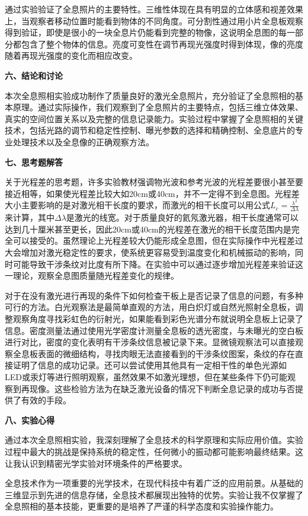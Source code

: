 ﻿\documentclass[12pt,a4paper]{article}
\begin{document}
通过实验验证了全息照片的主要特性。三维性体现在具有明显的立体感和视差效果上，当观察者移动位置时能看到物体的不同角度。可分割性通过用小片全息板观察得到验证，即使是很小的一块全息片仍能看到完整的物像，这说明全息图的每一部分都包含了整个物体的信息。亮度可变性在调节再现光强度时得到体现，像的亮度随着再现光强度的变化而相应改变。

\textbf{六、结论和讨论}

本次全息照相实验成功制作了质量良好的激光全息照片，充分验证了全息照相的基本原理。通过实际操作，我们观察到了全息照片的主要特点，包括三维立体效果、真实的空间位置关系以及完整的信息记录能力。实验过程中掌握了全息照相的关键技术，包括光路的调节和稳定性控制、曝光参数的选择和精确控制、全息底片的专业处理技术以及全息像的正确观察方法。

\textbf{七、思考题解答}

关于光程差的思考题，许多实验教材强调物光波和参考光波的光程差要很小甚至要接近相等，如果使光程差比较大如20cm或40cm，并不一定得不到全息图。光程差大小主要影响的是对激光相干长度的要求，而激光的相干长度可以用公式$L_c = \frac{\lambda^2}{\Delta\lambda}$来计算，其中$\Delta\lambda$是激光的线宽。对于质量良好的氦氖激光器，相干长度通常可以达到几十厘米甚至更长，因此20cm或40cm的光程差在激光的相干长度范围内是完全可以接受的。虽然理论上光程差较大仍能形成全息图，但在实际操作中光程差过大会增加对激光稳定性的要求，使系统更容易受到温度变化和机械振动的影响，同时可能导致干涉条纹对比度有所下降。在实验中可以通过逐步增加光程差来验证这一理论，观察全息图质量随光程差变化的规律。

对于在没有激光进行再现的条件下如何检查干板上是否记录了信息的问题，有多种可行的方法。白光观察法是最简单直观的方法，用白炽灯或自然光照射全息板，调整观察角度寻找彩虹色的衍射光，如果能看到彩色光谱分布就说明全息板上记录了信息。密度测量法通过使用光学密度计测量全息板的透光密度，与未曝光的空白板进行对比，密度的变化表明有干涉条纹信息被记录下来。显微镜观察法可以直接观察全息板表面的微细结构，寻找肉眼无法直接看到的干涉条纹图案，条纹的存在直接证明了信息的成功记录。还可以尝试使用其他具有一定相干性的单色光源如LED或汞灯等进行照明观察，虽然效果不如激光理想，但在某些条件下仍可能观察到再现像。这些检验方法为在缺乏激光设备的情况下判断全息记录的成功与否提供了有效的手段。

\textbf{八、实验心得}

通过本次全息照相实验，我深刻理解了全息技术的科学原理和实际应用价值。实验过程中最大的挑战是保持系统的稳定性，任何微小的振动都可能影响最终结果。这让我认识到精密光学实验对环境条件的严格要求。

全息技术作为一项重要的光学技术，在现代科技中有着广泛的应用前景。从基础的三维显示到先进的信息存储，全息技术都展现出独特的优势。实验让我不仅掌握了全息照相的基本技能，更重要的是培养了严谨的科学态度和实验操作能力。
\end{document}
